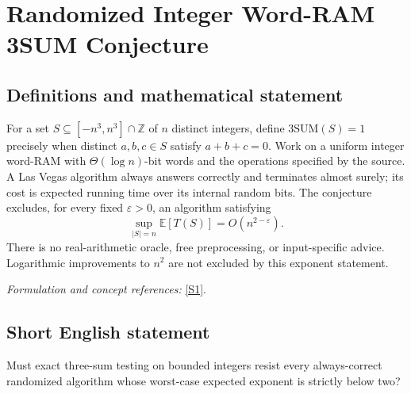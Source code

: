 \documentclass[11pt,a4paper]{article}
\newcommand{\Z}{\mathbb{Z}}
\newcommand{\E}{\mathbb{E}}
\newcommand{\eps}{\varepsilon}
\newcommand{\sref}[2]{\hyperlink{source:#1:#2}{[S#2]}}
\newif\ifshowcatalogue
\newcommand{\cataloguescope}[1]{\ifshowcatalogue
 \paragraph{Exact scope in the supplied catalogue.}
 \begin{quote}\small #1\end{quote}\fi}
\numberwithin{equation}{section}
\begin{document}
\setcounter{section}{160}
\clearpage
\section{\texorpdfstring{Randomized Integer Word-RAM 3SUM Conjecture}{Randomized Integer Word-RAM 3SUM Conjecture}}\label{161}
\subsection{Definitions and mathematical statement}
For a set $S\subseteq[-n^3,n^3]\cap\Z$ of $n$ distinct integers, define
$\mathrm{3SUM}(S)=1$ precisely when distinct $a,b,c\in S$ satisfy $a+b+c=0$. Work on a uniform integer word-RAM with $\Theta(\log n)$-bit words and the operations specified by the source. A Las Vegas algorithm always answers correctly and terminates almost surely; its cost is expected running time over its internal random bits. The conjecture excludes, for every fixed $\eps>0$, an algorithm satisfying
\[
 \sup_{|S|=n}\E[T(S)]=O(n^{2-\eps}).
\]
There is no real-arithmetic oracle, free preprocessing, or input-specific advice. Logarithmic improvements to $n^2$ are not excluded by this exponent statement.
\par\smallskip\textit{Formulation and concept references:} \sref{161}{1}.
\cataloguescope{For every epsilon>0, there is no uniform Las Vegas randomized integer word-RAM algorithm that, on every set S of n distinct integers in [-n\textasciicircum{}3,n\textasciicircum{}3], decides whether three distinct elements sum to zero in worst-case expected O(n\textasciicircum{}(2-epsilon)) time. Use the standard logarithmic-word model of Abboud–Vassilevska Williams Conjecture 1, with enough Theta(log n) bits for the input universe, unit-cost word arithmetic, comparisons, Boolean operations, shifts and indirect memory access; no real-number oracle or free input-dependent preprocessing is permitted. Las Vegas means an always-correct answer with almost-sure termination, expectation over internal randomness, and a bound uniform over all valid inputs. Constants may depend on the algorithm and epsilon. This is not a literal quadratic lower bound.}
\subsection{Short English statement}
Must exact three-sum testing on bounded integers resist every always-correct randomized algorithm whose worst-case expected exponent is strictly below two?
\end{document}
